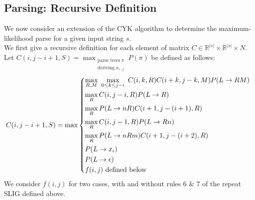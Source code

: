 \documentclass[11pt]{article}
\begin{document}
\subsection {Parsing: Recursive Definition}
We now consider an extension of the CYK algorithm to determine the maximum-likelihood
parse for a given input string $s$. \\
We first give a recursive definition for each element of matrix $C \in \mathds{R}^{|s|} \times \mathds{R}^{|s|} \times N$.\\
Let $C(i, j - i + 1, S) = \displaystyle{\mathop{\mbox{max}}_{\substack{\text{parse trees} \ \pi \\ \text{deriving} \ x_{i \cdots j}}} P(\pi)}$ be defined as follows:
\[ 
C(i, j - i + 1, S) = \mbox{max}
  \begin{dcases}
      \mathop{\mbox{max}}_{R,M} \ \mathop{\mbox{max}}_{0 \le k \le j - i} \ C(i, k, R) C(i+k, j-k, M) P(L \rightarrow R M) \\
      \mathop{\mbox{max}}_{R} C(i, j-i, R) P(L \rightarrow R) \\
      \mathop{\mbox{max}}_{R} P(L \rightarrow n R) C(i+1, j-(i+1), R) \\
      \mathop{\mbox{max}}_{R} C(i, j-1, R) P(L \rightarrow R n) \\
      \mathop{\mbox{max}}_{R} P(L \rightarrow n R m) C(i+1, j-(i+2), R) \\
      P(L \rightarrow x_i) \\
      P(L \rightarrow \epsilon) \\
      f(i, j)\text{ defined below}\\
  \end{dcases}
\]
We consider $f(i, j)$ for two cases, with and without rules 6 \& 7 of the repeat SLIG defined above.
\end{document}

